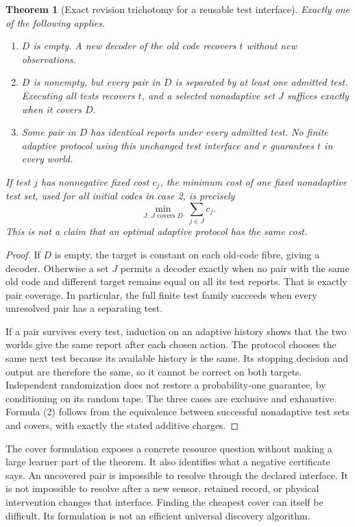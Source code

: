 \documentclass[11pt,letterpaper]{article}
\theoremstyle{plain}
\newtheorem{theorem}{Theorem}[section]
\theoremstyle{definition}
\begin{document}
\begin{theorem}[Exact revision trichotomy for a reusable test interface]\label{thm:trichotomy}
Exactly one of the following applies.
\begin{enumerate}
\item $D$ is empty. A new decoder of the old code recovers $t$ without new observations.
\item $D$ is nonempty, but every pair in $D$ is separated by at least one admitted test. Executing all tests recovers $t$, and a selected nonadaptive set $J$ suffices exactly when it covers $D$.
\item Some pair in $D$ has identical reports under every admitted test. No finite adaptive protocol using this unchanged test interface and $r$ guarantees $t$ in every world.
\end{enumerate}
If test $j$ has nonnegative fixed cost $c_j$, the minimum cost of one fixed nonadaptive test set, used for all initial codes in case 2, is precisely
\[
\min_{J:\,J\text{ covers }D}\ \sum_{j\in J}c_j.\tag{2}
\]
This is not a claim that an optimal adaptive protocol has the same cost.
\end{theorem}
\begin{proof}
If $D$ is empty, the target is constant on each old-code fibre, giving a decoder. Otherwise a set $J$ permits a decoder exactly when no pair with the same old code and different target remains equal on all its test reports. That is exactly pair coverage. In particular, the full finite test family succeeds when every unresolved pair has a separating test.

If a pair survives every test, induction on an adaptive history shows that the two worlds give the same report after each chosen action. The protocol chooses the same next test because its available history is the same. Its stopping decision and output are therefore the same, so it cannot be correct on both targets. Independent randomization does not restore a probability-one guarantee, by conditioning on its random tape. The three cases are exclusive and exhaustive. Formula (2) follows from the equivalence between successful nonadaptive test sets and covers, with exactly the stated additive charges.
\end{proof}

The cover formulation exposes a concrete resource question without making a large learner part of the theorem. It also identifies what a negative certificate says. An uncovered pair is impossible to resolve through the declared interface. It is not impossible to resolve after a new sensor, retained record, or physical intervention changes that interface. Finding the cheapest cover can itself be difficult. Its formulation is not an efficient universal discovery algorithm.
\end{document}

